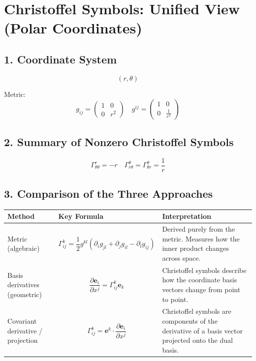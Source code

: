 \documentclass{article}
\begin{document}
	
	\section*{Christoffel Symbols: Unified View (Polar Coordinates)}
	
	\subsection*{1. Coordinate System}
	
	\[
	(r,\theta)
	\]
	
	Metric:
	\[
	g_{ij} =
	\begin{pmatrix}
		1 & 0 \\
		0 & r^2
	\end{pmatrix}
	\quad
	g^{ij} =
	\begin{pmatrix}
		1 & 0 \\
		0 & \frac{1}{r^2}
	\end{pmatrix}
	\]
	
	\subsection*{2. Summary of Nonzero Christoffel Symbols}
	
	\[
	\Gamma^r_{\theta\theta} = -r
	\quad
	\Gamma^\theta_{r\theta} = \Gamma^\theta_{\theta r} = \frac{1}{r}
	\]
	
	\subsection*{3. Comparison of the Three Approaches}
	
	\renewcommand{\arraystretch}{1.5}
	
	\begin{tabular}{| m{3.8cm} | m{5.5cm} | m{5.5cm} |}
		\hline
		\textbf{Method} & \textbf{Key Formula} & \textbf{Interpretation} \\
		\hline
		
		Metric (algebraic) &
		\[
		\Gamma^k_{ij} =
		\frac{1}{2} g^{kl}
		(\partial_i g_{jl} + \partial_j g_{il} - \partial_l g_{ij})
		\]
		&
		Derived purely from the metric. Measures how the inner product changes across space. \\
		
		\hline
		
		Basis derivatives (geometric) &
		\[
		\frac{\partial \mathbf{e}_i}{\partial x^j}
		=
		\Gamma^k_{ij} \mathbf{e}_k
		\]
		&
		Christoffel symbols describe how the coordinate basis vectors change from point to point. \\
		
		\hline
		
		Covariant derivative / projection &
		\[
		\Gamma^k_{ij}
		=
		\mathbf{e}^k \cdot \frac{\partial \mathbf{e}_i}{\partial x^j}
		\]
		&
		Christoffel symbols are components of the derivative of a basis vector projected onto the dual basis. \\
		
		\hline
		
	\end{tabular}
	
\end{document}
